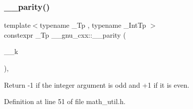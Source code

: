 \mbox{\label{namespace____gnu__cxx_a35c2cbd743275d2ba01b42aeb5e65201}} 
\subsubsection{\texorpdfstring{\+\_\+\+\_\+parity()}{\_\_parity()}}
{\footnotesize\ttfamily template$<$typename \+\_\+\+Tp , typename \+\_\+\+Int\+Tp $>$ \\
constexpr \+\_\+\+Tp \+\_\+\+\_\+gnu\+\_\+cxx\+::\+\_\+\+\_\+parity (\begin{DoxyParamCaption}\item[{\+\_\+\+Int\+Tp}]{\+\_\+\+\_\+k }\end{DoxyParamCaption})\hspace{0.3cm}{\ttfamily [inline]}, {\ttfamily [noexcept]}}

Return -\/1 if the integer argument is odd and +1 if it is even. 

Definition at line 51 of file math\+\_\+util.\+h.

